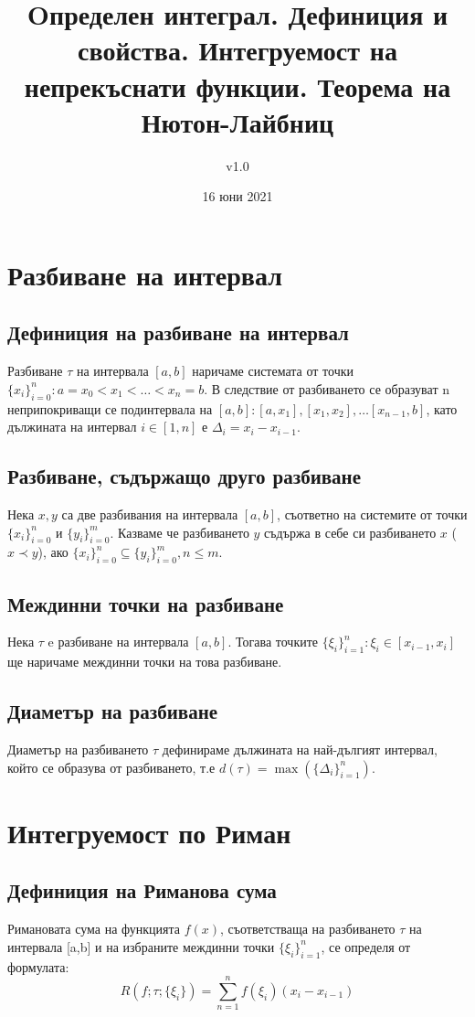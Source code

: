 \documentclass[fleqn,12pt]{article}
\title{Oпределен  интеграл.  Дефиниция  и  свойства.  Интегруемост  на непрекъснати функции. Теорема на Нютон-Лайбниц}
\author{v1.0}
\date{16 юни 2021}
\begin{document}
\maketitle

\tableofcontents
\pagebreak

\section{Разбиване на интервал}

\subsection{Дефиниция на разбиване на интервал}
Разбиване $\tau$ на интервала $[a,b]$ наричаме системата от точки $\{x_i\}_{i=0}^n : a = x_0 < x_1 < \dots < x_n = b$. В следствие от разбиването
се образуват n неприпокриващи се подинтервала на $[a,b] : [a, x_1], [x_1, x_2], \dots [x_{n-1}, b]$, като дължината на интервал $i \in [1,n]$ е $\Delta_i = x_i - x_{i-1}$.

\subsection{Разбиване, съдържащо друго разбиване}
Нека $x,y$ са две разбивания на интервала $[a,b]$, съответно на системите от точки $\{x_i\}_{i=0}^{n}$ и  $\{y_i\}_{i=0}^{m}$. Казваме че разбиването $y$ съдържа в себе си разбиването $x$ ($x \prec y$), ако
$\{x_i\}_{i=0}^{n} \subseteq  \{y_i\}_{i=0}^{m}, n \leq m$.

\subsection{Междинни точки на разбиване}
Нека $\tau$ e разбиване на интервала $[a,b]$. Тогава точките $\{\xi_i\}_{i=1}^n : \xi_i \in [x_{i-1},x_i]$ ще наричаме междинни точки на това разбиване.

\subsection{Диаметър на разбиване}
Диаметър на разбиването $\tau$ дефинираме дължината на най-дългият интервал, който се образува от разбиването, т.е $d(\tau)=\max(\{\Delta_i\}_{i=1}^n)$.

\section{Интегруемост по Риман}
\subsection{Дефиниция на Риманова сума}
Римановата сума на функцията $f(x)$, съответстваща на разбиването $\tau$ на интервала [a,b] и на избраните междинни точки $\{\xi_i\}_{i=1}^n$, се определя от формулата: 
\[ R(f;\tau;\{\xi_i\})=\sum_{n = 1}^{n} f(\xi_i)(x_i-x_{i-1}) \] 
\end{document}
